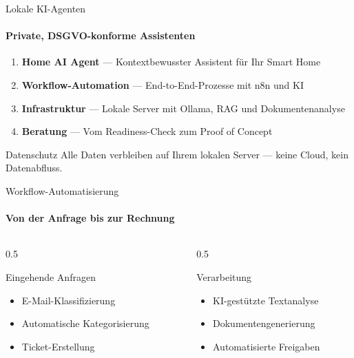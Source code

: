 \documentclass[aspectratio=169]{beamer}
\begin{document}
\begin{frame}{Lokale KI-Agenten}
  \framesubtitle{Private, DSGVO-konforme Assistenten}

  \begin{enumerate}
    \item \textbf{Home AI Agent} — Kontextbewusster Assistent für Ihr Smart Home
    \item \textbf{Workflow-Automation} — End-to-End-Prozesse mit n8n und KI
    \item \textbf{Infrastruktur} — Lokale Server mit Ollama, RAG und Dokumentenanalyse
    \item \textbf{Beratung} — Vom Readiness-Check zum Proof of Concept
  \end{enumerate}

  \vspace{0.5cm}
  \begin{exampleblock}{Datenschutz}
    Alle Daten verbleiben auf Ihrem lokalen Server — keine Cloud, kein Datenabfluss.
  \end{exampleblock}
\end{frame}

\begin{frame}{Workflow-Automatisierung}
  \framesubtitle{Von der Anfrage bis zur Rechnung}

  \begin{columns}[T]
    \begin{column}{0.5\textwidth}
      \begin{block}{Eingehende Anfragen}
        \begin{itemize}
          \item E-Mail-Klassifizierung
          \item Automatische Kategorisierung
          \item Ticket-Erstellung
        \end{itemize}
      \end{block}
    \end{column}
    \begin{column}{0.5\textwidth}
      \begin{block}{Verarbeitung}
        \begin{itemize}
          \item KI-gestützte Textanalyse
          \item Dokumentengenerierung
          \item Automatisierte Freigaben
        \end{itemize}
      \end{block}
    \end{column}
  \end{columns}
\end{frame}
\end{document}
